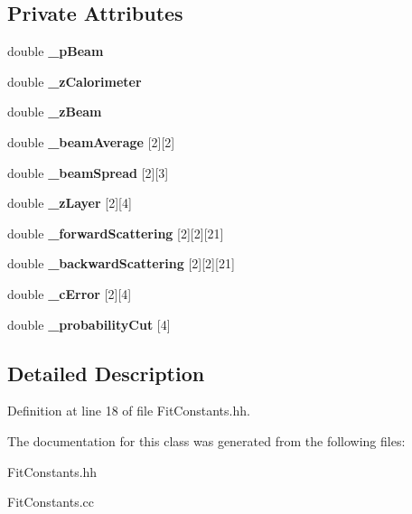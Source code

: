 \subsection*{Private Attributes}
\begin{DoxyCompactItemize}
\item 
double {\bfseries \-\_\-p\-Beam}\label{classTBTrack_1_1FitConstants_ad065c37d27302f166d583e92ff813e08}

\item 
double {\bfseries \-\_\-z\-Calorimeter}\label{classTBTrack_1_1FitConstants_aed3664e51cc6fc58c48e8b2f9ced4b32}

\item 
double {\bfseries \-\_\-z\-Beam}\label{classTBTrack_1_1FitConstants_a038e07323028e6f0307fa69685359301}

\item 
double {\bfseries \-\_\-beam\-Average} [2][2]\label{classTBTrack_1_1FitConstants_a701a22a05bbfdc8678fbb11f0a4a6242}

\item 
double {\bfseries \-\_\-beam\-Spread} [2][3]\label{classTBTrack_1_1FitConstants_a4d9da5ca3637928a5248e53e6b42cef8}

\item 
double {\bfseries \-\_\-z\-Layer} [2][4]\label{classTBTrack_1_1FitConstants_a93f27485f5ce91ac23ffbb9febf4f8f7}

\item 
double {\bfseries \-\_\-forward\-Scattering} [2][2][21]\label{classTBTrack_1_1FitConstants_a4a9803ee41a2659da3513e4df42fd349}

\item 
double {\bfseries \-\_\-backward\-Scattering} [2][2][21]\label{classTBTrack_1_1FitConstants_ab45f453a56ff58df89b085202ee14bf3}

\item 
double {\bfseries \-\_\-c\-Error} [2][4]\label{classTBTrack_1_1FitConstants_a2fafd67579669f4e2c291fd30370be36}

\item 
double {\bfseries \-\_\-probability\-Cut} [4]\label{classTBTrack_1_1FitConstants_a7c1fb70c3f9c89d6213b34ccdf88dc67}

\end{DoxyCompactItemize}


\subsection{Detailed Description}


Definition at line 18 of file Fit\-Constants.\-hh.



The documentation for this class was generated from the following files\-:\begin{DoxyCompactItemize}
\item 
Fit\-Constants.\-hh\item 
Fit\-Constants.\-cc\end{DoxyCompactItemize}

